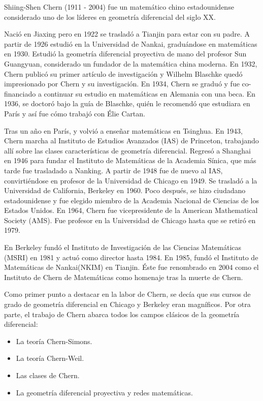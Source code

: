 \documentclass[a4paper, 11pt]{article}
\begin{document}
		Shiing-Shen Chern (1911 - 2004) fue un matemático chino estadounidense considerado uno de los líderes en geometría
		diferencial del siglo XX.
		
		Nació en Jiaxing pero en 1922 se trasladó a Tianjin para estar con su padre. A partir de 1926 estudió en la
		Universidad de Nankai, graduándose en matemáticas en 1930. Estudió la geometría diferencial proyectiva de mano
		del profesor Sun Guangyuan, considerado un fundador de la matemática china moderna. En 1932, Chern publicó su
		primer artículo de investigación y Wilhelm Blaschke quedó impresionado por Chern y su investigación. En 1934,
		Chern se graduó y fue co-financiado a continuar su estudio en matemáticas en Alemania con una beca. En 1936, se
		doctoró bajo la guía de Blaschke, quién le recomendó que estudiara en París y así fue cómo trabajó con Élie Cartan.
		
		Tras un año en París, y volvió a enseñar matemáticas en Tsinghua. En 1943, Chern marcha al Instituto de Estudios
		Avanzados (IAS) de Princeton, trabajando allí sobre las clases características de geometría diferencial. Regresó
		a Shanghai en 1946 para fundar el Instituto de Matemáticas de la Academia Sínica, que más tarde fue trasladado a
		Nanking. A partir de 1948 fue de nuevo al IAS, convirtiéndose en profesor de la Universidad de Chicago en 1949.
		Se trasladó a la Universidad de California, Berkeley en 1960. Poco después, se hizo ciudadano estadounidense y
		fue elegido miembro de la Academia Nacional de Ciencias de los Estados Unidos. En 1964, Chern fue vicepresidente
		de la American Mathematical Society (AMS). Fue profesor en la Universidad de Chicago hasta que se retiró en 1979.
		 
		En Berkeley fundó el Instituto de Investigación de las Ciencias Matemáticas (MSRI) en 1981 y actuó como director
		hasta 1984. En 1985, fundó el Instituto de Matemáticas de Nankai(NKIM) en Tianjin. Éste fue renombrado en 2004
		como el Instituto de Chern de Matemáticas como homenaje tras la muerte de Chern.
		
		Como primer punto a destacar en la labor de Chern, se decía que sus cursos de grado de geometría diferencial en
		Chicago y Berkeley eran magníficos. Por otra parte, el trabajo de Chern abarca todos los campos clásicos de la
		geometría diferencial:
		\begin{itemize}
			\item La teoría Chern-Simons.
			\item La teoría Chern-Weil.
			\item Las clases de Chern.
			\item La geometría diferencial proyectiva y redes matemáticas.
		\end{itemize}
		
\end{document}
